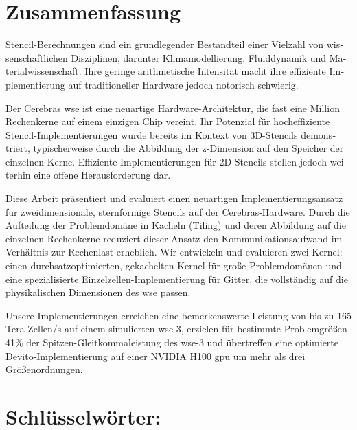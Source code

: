 \begin{otherlanguage}{ngerman}
\section*{Zusammenfassung}
Stencil-Berechnungen sind ein grundlegender Bestandteil einer Vielzahl von wissenschaftlichen Disziplinen, darunter Klimamodellierung, Fluiddynamik und Materialwissenschaft. Ihre geringe arithmetische Intensität macht ihre effiziente Implementierung auf traditioneller Hardware jedoch notorisch schwierig.

Der Cerebras \acf{wse} ist eine neuartige Hardware-Architektur, die fast eine Million Rechenkerne auf einem einzigen Chip vereint. Ihr Potenzial für hocheffiziente Stencil-Implementierungen wurde bereits im Kontext von 3D-Stencils demonstriert, typischerweise durch die Abbildung der z-Dimension auf den Speicher der einzelnen Kerne. Effiziente Implementierungen für 2D-Stencils stellen jedoch weiterhin eine offene Herausforderung dar.

Diese Arbeit präsentiert und evaluiert einen neuartigen Implementierungsansatz für zweidimensionale, sternförmige Stencils auf der Cerebras-Hardware. Durch die Aufteilung der Problemdomäne in Kacheln (Tiling) und deren Abbildung auf die einzelnen Rechenkerne reduziert dieser Ansatz den Kommunikationsaufwand im Verhältnis zur Rechenlast erheblich. Wir entwickeln und evaluieren zwei Kernel: einen durchsatzoptimierten, gekachelten Kernel für große Problemdomänen und eine spezialisierte Einzelzellen-Implementierung für Gitter, die vollständig auf die physikalischen Dimensionen des \ac{wse} passen.

Unsere Implementierungen erreichen eine bemerkenswerte Leistung von bis zu 165 Tera-Zellen/s auf einem simulierten \ac{wse}-3, erzielen für bestimmte Problemgrößen 41\% der Spitzen-Gleitkommaleistung des \ac{wse}-3 und übertreffen eine optimierte Devito-Implementierung auf einer NVIDIA H100 \ac{gpu} um mehr als drei Größenordnungen.

\section*{Schlüsselwörter:} \itshape \germankeywords
\end{otherlanguage}
